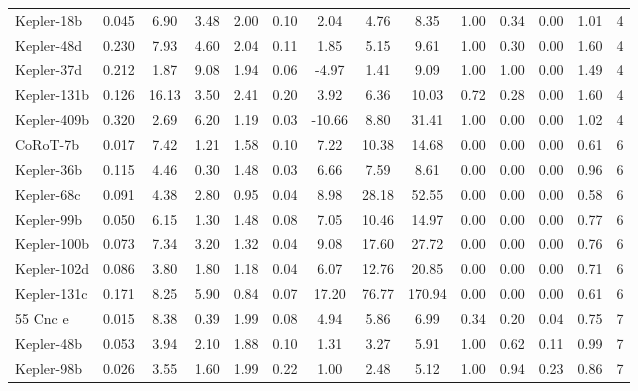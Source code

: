 \documentclass[]{emulateapj}
\begin{document}
\begin{table*}[h]
\begin{center}
{\begin{tabular}{lcccccccc|ccc|cc}
 Kepler-18b   &   0.045 &    6.90 &    3.48 &    2.00 &    0.10 &    2.04 &    4.76 &    8.35 &    1.00 &    0.34 &    0.00 &    1.01 &     4\\
 Kepler-48d   &   0.230 &    7.93 &    4.60 &    2.04 &    0.11 &    1.85 &    5.15 &    9.61 &    1.00 &    0.30 &    0.00 &    1.60 &     4\\
 Kepler-37d   &   0.212 &    1.87 &    9.08 &    1.94 &    0.06 &   -4.97 &    1.41 &    9.09 &    1.00 &    1.00 &    0.00 &    1.49 &     4\\
 Kepler-131b  &   0.126 &   16.13 &    3.50 &    2.41 &    0.20 &    3.92 &    6.36 &   10.03 &    0.72 &    0.28 &    0.00 &    1.60 &     4\\
 Kepler-409b  &   0.320 &    2.69 &    6.20 &    1.19 &    0.03 &  -10.66 &    8.80 &   31.41 &    1.00 &    0.00 &    0.00 &    1.02 &     4\\\hline

 CoRoT-7b     &   0.017 &    7.42 &    1.21 &    1.58 &    0.10 &    7.22 &   10.38 &   14.68 &    0.00 &    0.00 &    0.00 &    0.61 &     6\\
 Kepler-36b   &   0.115 &    4.46 &    0.30 &    1.48 &    0.03 &    6.66 &    7.59 &    8.61 &    0.00 &    0.00 &    0.00 &    0.96 &     6\\
 Kepler-68c   &   0.091 &    4.38 &    2.80 &    0.95 &    0.04 &    8.98 &   28.18 &   52.55 &    0.00 &    0.00 &    0.00 &    0.58 &     6\\
 Kepler-99b   &   0.050 &    6.15 &    1.30 &    1.48 &    0.08 &    7.05 &   10.46 &   14.97 &    0.00 &    0.00 &    0.00 &    0.77 &     6\\
 Kepler-100b  &   0.073 &    7.34 &    3.20 &    1.32 &    0.04 &    9.08 &   17.60 &   27.72 &    0.00 &    0.00 &    0.00 &    0.76 &     6\\
 Kepler-102d  &   0.086 &    3.80 &    1.80 &    1.18 &    0.04 &    6.07 &   12.76 &   20.85 &    0.00 &    0.00 &    0.00 &    0.71 &     6\\
 Kepler-131c  &   0.171 &    8.25 &    5.90 &    0.84 &    0.07 &   17.20 &   76.77 &  170.94 &    0.00 &    0.00 &    0.00 &    0.61 &     6\\

 55 Cnc e       &   0.015 &    8.38 &    0.39 &    1.99 &    0.08 &    4.94 &    5.86 &    6.99 &    0.34 &    0.20 &    0.04 &    0.75 &     7\\
 Kepler-48b   &   0.053 &    3.94 &    2.10 &    1.88 &    0.10 &    1.31 &    3.27 &    5.91 &    1.00 &    0.62 &    0.11 &    0.99 &     7\\
 Kepler-98b   &   0.026 &    3.55 &    1.60 &    1.99 &    0.22 &    1.00 &    2.48 &    5.12 &    1.00 &    0.94 &    0.23 &    0.86 &     7\\


\end{tabular}}
\end{center}
\end{table*}
\end{document}
